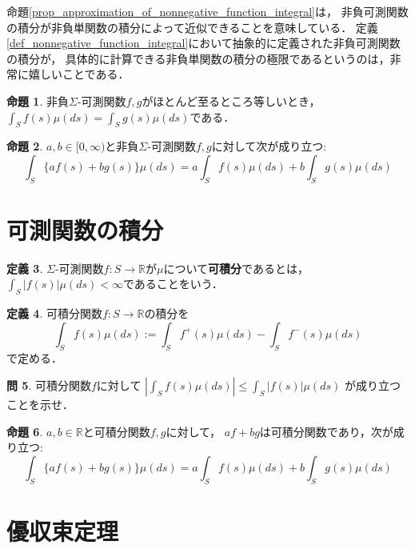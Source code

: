 \documentclass{jsreport}
\theoremstyle{definition}
\newtheorem{defi}{定義}[section]
\newtheorem{prop}[defi]{命題}
\newtheorem{qst}[defi]{問}
\begin{document}
命題\ref{prop_approximation_of_nonnegative_function_integral}は，
非負可測関数の積分が非負単関数の積分によって近似できることを意味している．
定義\ref{def_nonnegative_function_integral}において抽象的に定義された非負可測関数の積分が，
具体的に計算できる非負単関数の積分の極限であるというのは，非常に嬉しいことである．

\begin{prop}\label{prop_equal_ae_then_integral_equal}
非負$\Sigma$-可測関数$f,g$がほとんど至るところ等しいとき，
$\displaystyle\int_Sf(s)\mu(ds)=\int_Sg(s)\mu(ds)$である．
\end{prop}

\begin{prop}\label{prop_linearity_of_nonnegative_function_integral}
$a,b\in[0,\infty)$と非負$\Sigma$-可測関数$f,g$に対して次が成り立つ:
\[ \int_S\{af(s)+bg(s)\}\mu(ds)=a\int_Sf(s)\mu(ds)+b\int_Sg(s)\mu(ds) \]
\end{prop}

\section{可測関数の積分}

\begin{defi}\label{def_integrable_function}
$\Sigma$-可測関数$f \colon S\to\mathbb{R}$が$\mu$について\textbf{可積分}であるとは，
$\displaystyle\int_S|f(s)|\mu(ds)<\infty$であることをいう．

\end{defi}

\begin{defi}\label{def_measurable_function_integral}
可積分関数$f \colon S\to\mathbb{R}$の積分を
\[ \int_S f(s)\mu(ds):=\int_S f^+(s)\mu(ds)-\int_S f^-(s)\mu(ds)  \]
で定める．
\end{defi}

\begin{qst}\label{qst_absolute_integral_and_integral_absolute}
可積分関数$f$に対して
$\displaystyle\left|\int_Sf(s)\mu(ds)\right|\leq\int_S|f(s)|\mu(ds)$
が成り立つことを示せ．
\end{qst}

\begin{prop}\label{prop_linearity_of_integrable_function_integral}
$a,b\in\mathbb{R}$と可積分関数$f,g$に対して，
$af+bg$は可積分関数であり，次が成り立つ:
\[ \int_S\{af(s)+bg(s)\}\mu(ds)=a\int_Sf(s)\mu(ds)+b\int_Sg(s)\mu(ds) \]
\end{prop}

\section{優収束定理}
\end{document}
